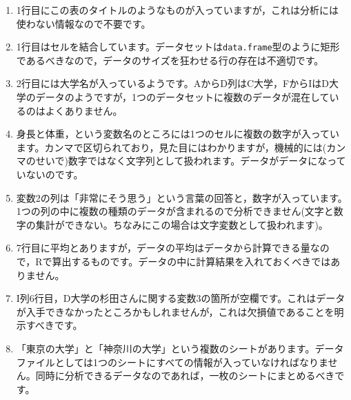 \begin{enumerate}
	\item 1行目にこの表のタイトルのようなものが入っていますが，これは分析には使わない情報なので不要です。
	\item 1行目はセルを結合しています。データセットは\texttt{data.frame}型のように矩形であるべきなので，データのサイズを狂わせる行の存在は不適切です。
	\item 2行目には大学名が入っているようです。AからD列はC大学，FからIはD大学のデータのようですが，1つのデータセットに複数のデータが混在しているのはよくありません。
	\item 身長と体重，という変数名のところには1つのセルに複数の数字が入っています。カンマで区切られており，見た目にはわかりますが，機械的には(カンマのせいで)数字ではなく文字列として扱われます。データがデータになっていないのです。
	\item 変数2の列は「非常にそう思う」という言葉の回答と，数字が入っています。1つの列の中に複数の種類のデータが含まれるので分析できません(文字と数字の集計ができない。ちなみにこの場合は文字変数として扱われます)。
	\item 7行目に平均とありますが，データの平均はデータから計算できる量なので，Rで算出するものです。データの中に計算結果を入れておくべきではありません。
	\item I列6行目，D大学の杉田さんに関する変数3の箇所が空欄です。これはデータが入手できなかったところかもしれませんが，これは欠損値であることを明示すべきです。
	\item 「東京の大学」と「神奈川の大学」という複数のシートがあります。データファイルとしては1つのシートにすべての情報が入っていなければなりません。同時に分析できるデータなのであれば，一枚のシートにまとめるべきです。
\end{enumerate}
